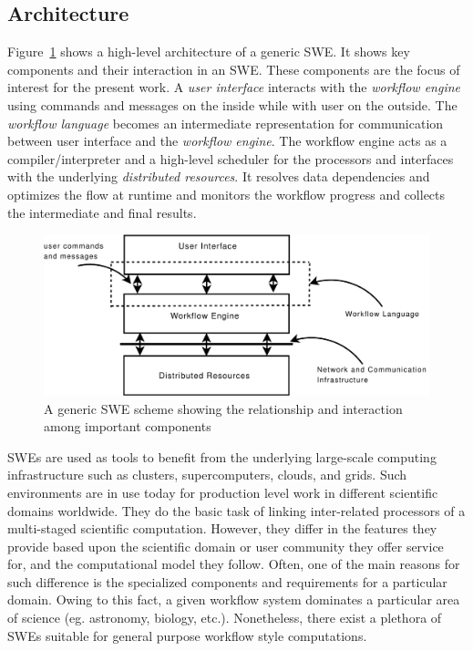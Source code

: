 \subsection{Architecture}
Figure~\ref{fig:wfms} shows a high-level architecture of a generic SWE. It shows key
components and their interaction in an SWE. These components are the focus of
interest for the present work. A \textit{user interface} interacts with the
\textit{workflow engine} using commands and messages on the inside while with
user on the outside. The \textit{workflow language} becomes an intermediate
representation for communication between user interface and the
\textit{workflow engine}. The workflow engine acts as a compiler/interpreter
and a high-level scheduler for the processors and interfaces with the
underlying \textit{distributed resources}. It resolves data dependencies and
optimizes the flow at runtime and monitors the workflow progress and collects
the intermediate and final results.

%
\begin{figure}[htb]
\begin{center}
\includegraphics[width=\linewidth]{figures/workflow_interfaces_and_language}
\caption{A generic SWE scheme showing the relationship and interaction among important components}
\label{fig:wfms}
\end{center}
\end{figure}
%
SWEs are used as tools to benefit from the underlying large-scale computing
infrastructure such as clusters, supercomputers, clouds, and grids. Such
environments are in use today for production level work in different scientific
domains worldwide. They do the basic task of linking inter-related processors
of a multi-staged scientific computation. However, they differ in the features
they provide based upon the scientific domain or user community they offer
service for, and the computational model they follow. Often, one of the main
reasons for such difference is the specialized components and requirements for
a particular domain. Owing to this fact, a given workflow system dominates a
particular area of science (eg. astronomy, biology, etc.). Nonetheless, there
exist a plethora of SWEs suitable for general purpose workflow style
computations.

